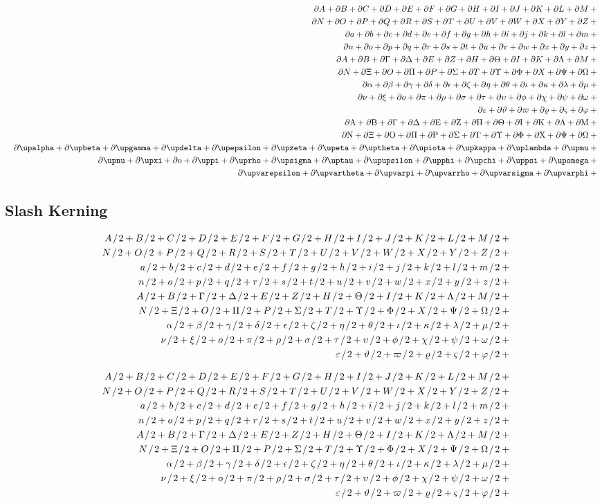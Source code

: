 \documentclass[11pt, a4paper, oneside]{article}
\newcommand*{\divslash}{%
	\mathbin{%
		\nonscript\mskip-2mu / \nonscript\mskip-2mu%
	}%
}  %
\theoremstyle{Plain}
\theoremstyle{Definition}
\theoremstyle{Remark}
\begin{document}
\begin{appendix}
	\begin{eqnarray*}
	\gdef\test#1{\partial #1+{}}%
	  && {\testupperi}\\
	  && {\testupperii}\\
	  && {\testloweri}\\
	  && {\testlowerii}\\
	  && {\testupgreeki}\\
	  && {\testupgreekii}\\
	  && {\testlowgreeki}\\
	  && {\testlowgreekii}\\
	  && {\testlowgreekiii}\\
	\gdef\test#1{\partial \mathrm{#1}+{}}%
	  && {\testupgreeki}\\
	  && {\testupgreekii}\\
	  && {\testlowgreekupi}\\
	  && {\testlowgreekupii}\\
	  && {\testlowgreekupiii}\\
	\end{eqnarray*}%

	\subsection{Slash Kerning \showfamily}

	\def\test#1{1 \divslash #1+{}}
	\begin{eqnarray*}
	  && {\testupperi}\\
	  && {\testupperii}\\
	  && {\testloweri}\\
	  && {\testlowerii}\\
	  && {\testupgreeki}\\
	  && {\testupgreekii}\\
	  && {\testlowgreeki}\\
	  && {\testlowgreekii}\\
	  && {\testlowgreekiii}
	\end{eqnarray*}

	\def\test#1{#1 \divslash 2+{}}
	\begin{eqnarray*}
	  && {\testupperi}\\
	  && {\testupperii}\\
	  && {\testloweri}\\
	  && {\testlowerii}\\
	  && {\testupgreeki}\\
	  && {\testupgreekii}\\
	  && {\testlowgreeki}\\
	  && {\testlowgreekii}\\
	  && {\testlowgreekiii}
	\end{eqnarray*}


\end{appendix}
\end{document}
